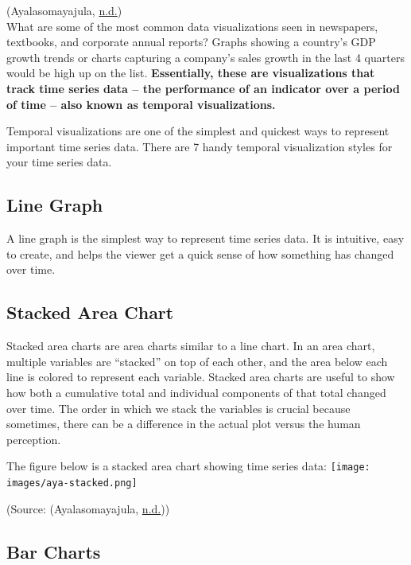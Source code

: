 \documentclass[]{book}
\begin{document}
(Ayalasomayajula, \protect\hyperlink{ref-aya-time-series}{n.d.})\\
What are some of the most common data visualizations seen in newspapers, textbooks, and corporate annual reports? Graphs showing a country's GDP growth trends or charts capturing a company's sales growth in the last 4 quarters would be high up on the list. \textbf{Essentially, these are visualizations that track time series data -- the performance of an indicator over a period of time -- also known as temporal visualizations.}

Temporal visualizations are one of the simplest and quickest ways to represent important time series data. There are 7 handy temporal visualization styles for your time series data.

\hypertarget{line-graph}{%
\subsection{Line Graph}\label{line-graph}}

A line graph is the simplest way to represent time series data. It is intuitive, easy to create, and helps the viewer get a quick sense of how something has changed over time.

\hypertarget{stacked-area-chart}{%
\subsection{Stacked Area Chart}\label{stacked-area-chart}}

Stacked area charts are area charts similar to a line chart. In an area chart, multiple variables are ``stacked'' on top of each other, and the area below each line is colored to represent each variable. Stacked area charts are useful to show how both a cumulative total and individual components of that total changed over time. The order in which we stack the variables is crucial because sometimes, there can be a difference in the actual plot versus the human perception.

The figure below is a stacked area chart showing time series data:
\texttt{[image: images/aya-stacked.png]}

(Source: (Ayalasomayajula, \protect\hyperlink{ref-aya-time-series}{n.d.}))

\hypertarget{bar-charts}{%
\subsection{Bar Charts}\label{bar-charts}}
\end{document}
